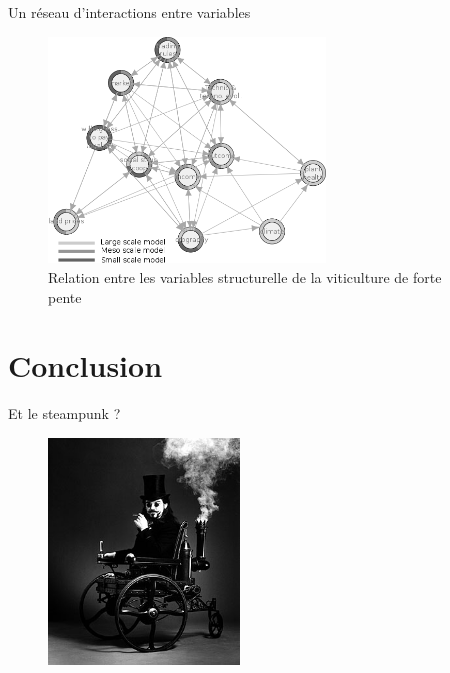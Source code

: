 \documentclass[newPxFont]{beamer}
\begin{document}
\begin{frame}[c]{Un réseau d'interactions entre variables}
  \vspace{-2em}
  \begin{figure}
   \includegraphics[height=6cm]{img/a_igraph_variables_structurelle.png}
   \caption{Relation entre les variables structurelle de la viticulture de forte pente}
  \end{figure}
\end{frame}


%
%
\section{Conclusion}

\begin{frame}[c]{Et le steampunk ?}
  \vspace{-2em}

  \begin{figure}
   \includegraphics[height=6cm]{img/a_www.jpg}
  \end{figure}
\end{frame}
\end{document}
